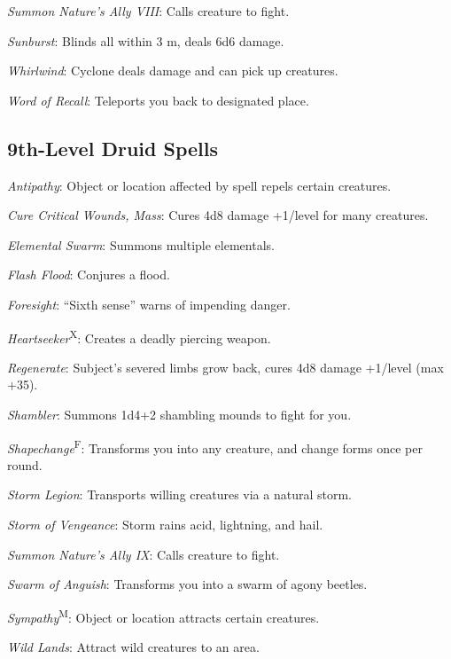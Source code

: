 \textit{Summon Nature's Ally VIII}: Calls creature to fight.

\textit{Sunburst}: Blinds all within 3 m, deals 6d6 damage.

\textit{Whirlwind}: Cyclone deals damage and can pick up creatures.

\textit{Word of Recall}: Teleports you back to designated place.



\subsection{9th-Level Druid Spells}

\textit{Antipathy}: Object or location affected by spell repels certain creatures.

\textit{Cure Critical Wounds, Mass}: Cures 4d8 damage +1/level for many creatures.

\textit{Elemental Swarm}: Summons multiple elementals.

\textit{Flash Flood}: Conjures a flood.

\textit{Foresight}: “Sixth sense” warns of impending danger.

\textit{Heartseeker}\textsuperscript{X}: Creates a deadly piercing weapon.

\textit{Regenerate}: Subject's severed limbs grow back, cures 4d8 damage +1/level (max +35).

\textit{Shambler}: Summons 1d4+2 shambling mounds to fight for you.

\textit{Shapechange}\textsuperscript{F}: Transforms you into any creature, and change forms once per round.

\textit{Storm Legion}: Transports willing creatures via a natural storm.

\textit{Storm of Vengeance}: Storm rains acid, lightning, and hail.

\textit{Summon Nature's Ally IX}: Calls creature to fight.

\textit{Swarm of Anguish}: Transforms you into a swarm of agony beetles.

\textit{Sympathy}\textsuperscript{M}: Object or location attracts certain creatures.

\textit{Wild Lands}: Attract wild creatures to an area.